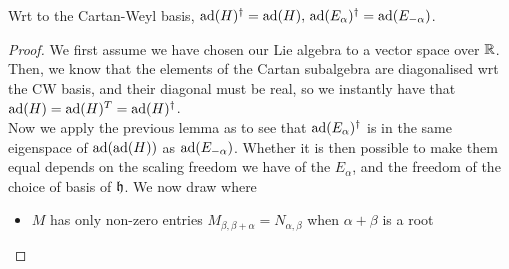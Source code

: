 \documentclass{article}
\begin{document}
\begin{lemma}
	Wrt to the Cartan-Weyl basis, $\operatorname{ad}(H)^\dagger = \operatorname{ad}(H), \, \operatorname{ad}(E_\alpha)^\dagger = \operatorname{ad}(E_{-\alpha})$. 
\end{lemma}
\begin{proof}
	We first assume we have chosen our Lie algebra to a vector space over $\mathbb{R}$. Then, we know that the elements of the Cartan subalgebra are diagonalised wrt the CW basis, and their diagonal must be real, so we instantly have that $\operatorname{ad}(H) = \operatorname{ad}(H)^T = \operatorname{ad}(H)^\dagger$. \\
	Now we apply the previous lemma as 
to see that $\operatorname{ad}(E_\alpha)^\dagger$ is in the same eigenspace of $\operatorname{ad}(\operatorname{ad}(H))$ as $\operatorname{ad}(E_{-\alpha})$. Whether it is then possible to make them equal depends on the scaling freedom we have of the $E_\alpha$, and the freedom of the choice of basis of $\mathfrak{h}$. We now draw 
where\begin{itemize}
	\item $M$ has only non-zero entries $M_{\beta,\beta+\alpha} = N_{\alpha,\beta}$ when $\alpha+\beta$ is a root

\end{itemize}
\end{proof}
\end{document}
